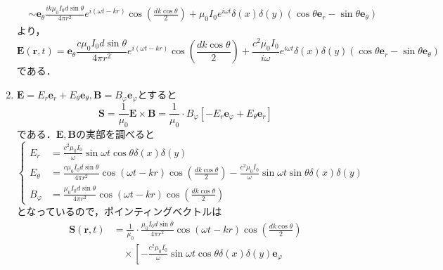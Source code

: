 \documentclass[a4paper,pdflatex,ja=standard]{bxjsarticle}
\begin{document}
\begin{enumerate}
\begin{align}
    &\sim
    \bm{e}_{\theta}
    \frac{ik\mu_{0}I_{0}d\sin\theta}{4\pi r^2
    }e^{i(\omega t-kr)}\cos\left( \frac{dk\cos\theta}{2} \right)
    +\mu_{0}I_{0}e^{i\omega t}\delta(x)\delta(y)(\cos\theta\bm{e}_{r}-\sin\theta\bm{e}_{\theta})
  \end{align}
  より，
  \begin{equation}
    \bm{E}(\bm{r},t)
    =
    \bm{e}_{\theta}
    \frac{c\mu_{0}I_{0}d\sin\theta}{4\pi r^2
    }e^{i(\omega t-kr)}\cos\left( \frac{dk\cos\theta}{2} \right)
    +\frac{c^2\mu_{0}I_{0}}{i\omega}e^{i\omega t}\delta(x)\delta(y)(\cos\theta\bm{e}_{r}-\sin\theta\bm{e}_{\theta})
  \end{equation}
  である．

  \item 
  $\bm{E}=E_{r}\bm{e}_{r}+E_{\theta}\bm{e}_{\theta} , \bm{B}=B_{\varphi}\bm{e}_{\varphi}$とすると
  \begin{equation}
    \bm{S}
    =
    \frac{1}{\mu_{0}}
    \bm{E}\times\bm{B}
    =
    \frac{1}{\mu_{0}}\cdot
    B_{\varphi}
    \left[ -E_{r}\bm{e}_{\varphi}+E_{\theta}\bm{e}_{r} \right]
  \end{equation}
  である．$\bm{E},\bm{B}$の実部を調べると
  \begin{equation}
    \left\{
      \begin{alignedat}{1}
        E_{r}
        &=
        \frac{c^2\mu_{0}I_{0}}{\omega}\sin\omega t\cos\theta\delta(x)\delta(y)
        \\
        E_{\theta}
        &=
        \frac{c\mu_{0}I_{0}d\sin\theta}{4\pi r^2}
        \cos(\omega t-kr)\cos\left( \frac{dk\cos\theta}{2} \right)
        -
        \frac{c^2\mu_{0}I_{0}}{\omega}\sin\omega t\sin\theta\delta(x)\delta(y)
        \\
        B_{\varphi}
        &=
        \frac{\mu_{0}I_{0}d\sin\theta}{4\pi r^2}
        \cos(\omega t-kr)
        \cos\left( \frac{dk\cos\theta}{2} \right)
      \end{alignedat}
    \right.
  \end{equation}
  となっているので，ポインティングベクトルは
  \begin{align}
    \bm{S}(\bm{r},t)
    &=
    \frac{1}{\mu_{0}}\cdot
    \frac{\mu_{0}I_{0}d\sin\theta}{4\pi r^2}
    \cos(\omega t-kr)
    \cos\left( \frac{dk\cos\theta}{2} \right)
    \nonumber
    \\
    &\quad
    \times
    \left[  
      -
      \frac{c^2\mu_{0}I_{0}}{\omega}\sin\omega t\cos\theta\delta(x)\delta(y)
      \bm{e}_{\varphi}
    \right.
    \nonumber
    \\

\end{align}
\end{enumerate}
\end{document}
